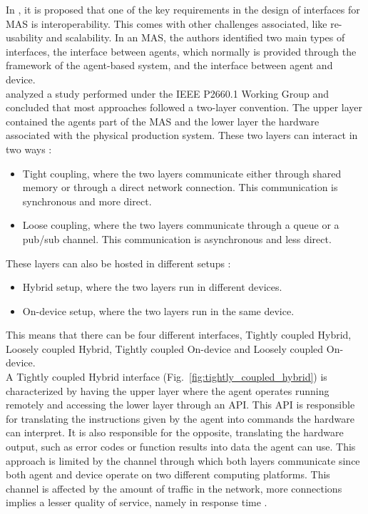 In \cite{Karnouskos2019}, it is proposed that one of the key requirements in the design of interfaces for \acrshort{MAS} is interoperability. This comes with other challenges associated, like re-usability and scalability. In an \acrshort{MAS}, the authors identified two main types of interfaces, the interface between agents, which normally is provided through the framework of the agent-based system, and the interface between agent and device. \\


\citeauthor{8591641} \cite{8591641} analyzed a study performed under the IEEE P2660.1 Working Group \cite{9340089} and concluded that most approaches followed a two-layer convention. The upper layer contained the agents part of the MAS and the lower layer the hardware associated with the physical production system. These two layers can interact in two ways \cite{8591641}:
\begin{itemize}
	\item Tight coupling, where the two layers communicate either through shared memory or through a direct network connection. This communication is synchronous and more direct.
	\item Loose coupling, where the two layers communicate through a queue or a pub/sub channel. This communication is asynchronous and less direct.
\end{itemize}

These layers can also be hosted in different setups \cite{8591641}:
\begin{itemize}
	\item Hybrid setup, where the two layers run in different devices.
	\item On-device setup, where the two layers run in the same device. 
\end{itemize}

This means that there can be four different interfaces, Tightly coupled Hybrid, Loosely coupled Hybrid, Tightly coupled On-device and Loosely coupled On-device.\\

A Tightly coupled Hybrid interface (Fig.~\ref{fig:tightly_coupled_hybrid}) is characterized by having the upper layer where the agent operates running remotely and accessing the lower layer through an \acrshort{API}. This \acrshort{API} is responsible for translating the instructions given by the agent into commands the hardware can interpret. It is also responsible for the opposite, translating the hardware output, such as error codes or function results into data the agent can use. This approach is limited by the channel through which both layers communicate since both agent and device operate on two different computing platforms. This channel is affected by the amount of traffic in the network, more connections implies a lesser quality of service, namely in response time \cite{8591641}.\\


